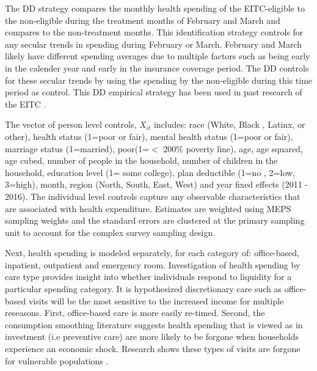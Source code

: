 \documentclass[smallcondensed,referee]{svjour3}
\begin{document}
 The DD strategy compares the monthly health spending of the EITC-eligible to the non-eligible during the treatment months of February and March and compares to the non-treatment months. This identification strategy controls for any secular trends in spending during February or March. February and March likely have different spending averages due to multiple factors such as being early in the calender year and early in the insurance coverage period. The DD controls for these secular trends by using the spending by the non-eligible during this time period as control. This DD empirical strategy has been used in past research of the EITC \citep{hamad_short-term_2019, rehkopf_short-term_2014, hamad_estimating_2018, collin_short-term_2020}.
 
  The vector of person level controls, $X_{it}$ includes: race (White, Black , Latinx, or other), health status (1=poor or fair), mental health status (1=poor or fair), marriage status (1=married), poor(1=$<$ 200\% poverty line), age, age squared, age cubed, number of people in the household, number of children in the household, education level (1= some college), plan deductible (1=no , 2=low, 3=high), month, region (North, South, East, West) and year fixed effects (2011 - 2016). The individual level controls capture any observable characteristics that are associated with health expenditure. Estimates are weighted using MEPS sampling weights and the standard errors are clustered at the primary sampling unit to account for the complex survey sampling design. 

Next, health spending is modeled separately, for each category of:  office-based, inpatient, outpatient and emergency room.  Investigation of health spending by care type provides insight into whether individuals respond to liquidity for a particular spending category. It is hypothesized discretionary care such as office-based visits will be the most sensitive to the increased income for multiple reseasons. First, office-based care is more easily re-timed. Second, the consumption smoothing literature suggests health spending that is viewed as in investment (i.e preventive care) are more likely to be forgone when households experience an economic shock.  Research shows these types of visits are forgone for vulnerable populations \citep{sherman_health_2017} .
\end{document}
